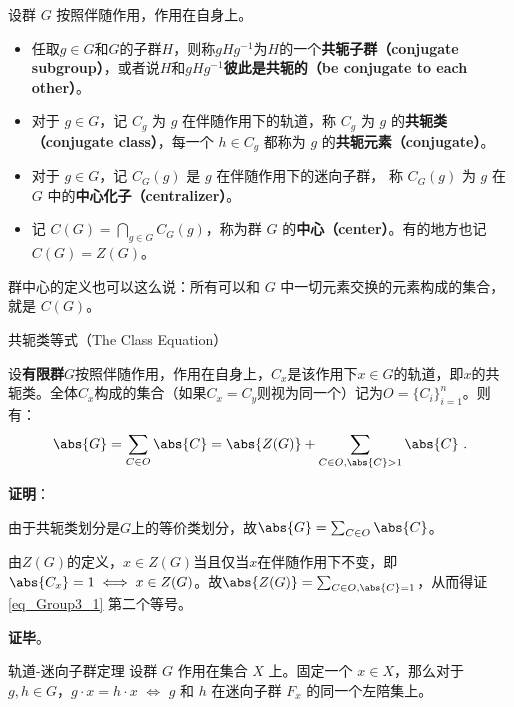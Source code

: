 \begin{definition}{}
设群 $G$ 按照伴随作用，作用在自身上。
\begin{itemize}
\item 任取$g\in G$和$G$的子群$H$，则称$gHg^{-1}$为$H$的一个\textbf{共轭子群（conjugate subgroup）}，或者说$H$和$gHg^{-1}$\textbf{彼此是共轭的（be conjugate to each other）}。
\item 对于 $g\in G$，记 $C_g$ 为 $g$ 在伴随作用下的轨道，称 $C_g$ 为 $g$ 的\textbf{共轭类（conjugate class）}，每一个 $h\in C_g$ 都称为 $g$ 的\textbf{共轭元素（conjugate）}。

\item 对于 $g\in G$，记 $C_G(g)$ 是 $g$ 在伴随作用下的迷向子群， 称 $C_G(g)$ 为 $g$ 在 $G$ 中的\textbf{中心化子（centralizer）}。

\item 记 $C(G)=\bigcap_{g\in G} C_G(g)$，称为群 $G$ 的\textbf{中心（center）}。有的地方也记$C(G)=Z(G)$。
\end{itemize}
\end{definition}

群中心的定义也可以这么说：所有可以和 $G$ 中一切元素交换的元素构成的集合，就是 $C(G)$。








\begin{theorem}{共轭类等式（The Class Equation）}\label{the_Group3_4}

设\textbf{有限群}$G$按照伴随作用，作用在自身上，$C_x$是该作用下$x\in G$的轨道，即$x$的共轭类。全体$C_x$构成的集合（如果$C_x=C_y$则视为同一个）记为$O=\{C_i\}_{i=1}^n$。则有：
\begin{equation}\label{eq_Group3_1}
\abs{G} = \sum_{C\in O} \abs{C} = \abs{Z(G)} + \sum_{C\in O, \abs{C}>1} \abs{C}~.
\end{equation}

\end{theorem}


\textbf{证明}：

由于共轭类划分是$G$上的等价类划分，故$\abs{G} = \sum_{C\in O} \abs{C}$。

由$Z(G)$的定义，$x\in Z(G)$当且仅当$x$在伴随作用下不变，即$\abs{C_x}=1\iff x\in Z(G)$。故$\abs{Z(G)}=\sum_{C\in O, \abs{C}=1}$，从而得证\autoref{eq_Group3_1} 第二个等号。

\textbf{证毕}。




\begin{theorem}{轨道-迷向子群定理}\label{the_Group3_2}
设群 $G$ 作用在集合 $X$ 上。固定一个 $x\in X$，那么对于 $g, h\in G$，$g\cdot x= h\cdot x$ $\iff$ $g$ 和 $h$ 在迷向子群 $F_x$ 的同一个左陪集上。
\end{theorem}

